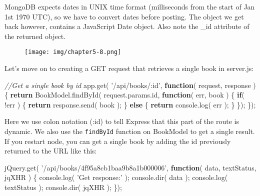 \documentclass[9pt]{book}
\newenvironment{Shaded}{}{}
\newcommand{\KeywordTok}[1]{\textcolor[rgb]{0.00,0.44,0.13}{\textbf{{#1}}}}
\newcommand{\StringTok}[1]{\textcolor[rgb]{0.25,0.44,0.63}{{#1}}}
\newcommand{\CommentTok}[1]{\textcolor[rgb]{0.38,0.63,0.69}{\textit{{#1}}}}
\newcommand{\OtherTok}[1]{\textcolor[rgb]{0.00,0.44,0.13}{{#1}}}
\newcommand{\FunctionTok}[1]{\textcolor[rgb]{0.02,0.16,0.49}{{#1}}}
\newcommand{\NormalTok}[1]{{#1}}
\begin{document}
MongoDB expects dates in UNIX time format (milliseconds from the start
of Jan 1st 1970 UTC), so we have to convert dates before posting. The
object we get back however, contains a JavaScript Date object. Also note
the \_id attribute of the returned object.

\begin{figure}[htbp]
\centering
\texttt{[image: img/chapter5-8.png]}
\end{figure}

Let's move on to creating a GET request that retrieves a single book in
server.js:

\begin{Shaded}
\begin{Highlighting}[]
\CommentTok{//Get a single book by id}
\OtherTok{app}\NormalTok{.}\FunctionTok{get}\NormalTok{( }\StringTok{'/api/books/:id'}\NormalTok{, }\KeywordTok{function}\NormalTok{( request, response ) \{}
    \KeywordTok{return} \OtherTok{BookModel}\NormalTok{.}\FunctionTok{findById}\NormalTok{( }\OtherTok{request}\NormalTok{.}\OtherTok{params}\NormalTok{.}\FunctionTok{id}\NormalTok{, }\KeywordTok{function}\NormalTok{( err, book ) \{}
        \KeywordTok{if}\NormalTok{( !err ) \{}
            \KeywordTok{return} \OtherTok{response}\NormalTok{.}\FunctionTok{send}\NormalTok{( book );}
        \NormalTok{\} }\KeywordTok{else} \NormalTok{\{}
            \KeywordTok{return} \OtherTok{console}\NormalTok{.}\FunctionTok{log}\NormalTok{( err );}
        \NormalTok{\}}
    \NormalTok{\});}
\NormalTok{\});}
\end{Highlighting}
\end{Shaded}

Here we use colon notation (:id) to tell Express that this part of the
route is dynamic. We also use the \texttt{findById} function on
BookModel to get a single result. If you restart node, you can get a
single book by adding the id previously returned to the URL like this:

\begin{Shaded}
\begin{Highlighting}[]
\OtherTok{jQuery}\NormalTok{.}\FunctionTok{get}\NormalTok{( }\StringTok{'/api/books/4f95a8cb1baa9b8a1b000006'}\NormalTok{, }\KeywordTok{function}\NormalTok{( data, textStatus, jqXHR ) \{}
    \OtherTok{console}\NormalTok{.}\FunctionTok{log}\NormalTok{( }\StringTok{'Get response:'} \NormalTok{);}
    \OtherTok{console}\NormalTok{.}\FunctionTok{dir}\NormalTok{( data );}
    \OtherTok{console}\NormalTok{.}\FunctionTok{log}\NormalTok{( textStatus );}
    \OtherTok{console}\NormalTok{.}\FunctionTok{dir}\NormalTok{( jqXHR );}
\NormalTok{\});}
\end{Highlighting}
\end{Shaded}
\end{document}
